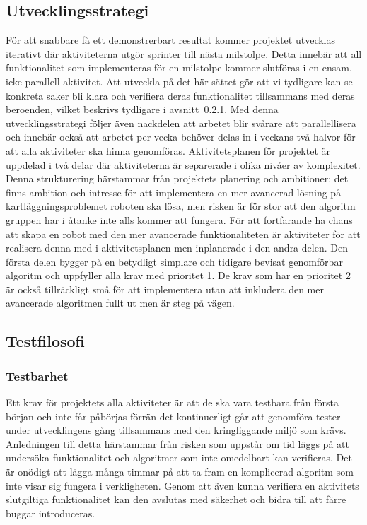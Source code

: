 \documentclass{article}
\begin{document}
\subsection{Utvecklingsstrategi}
För att snabbare få ett demonstrerbart resultat kommer projektet utvecklas iterativt där aktiviteterna utgör sprinter till nästa milstolpe. Detta innebär att all funktionalitet som implementeras för en milstolpe kommer slutföras i en ensam, icke-parallell aktivitet. Att utveckla på det här sättet gör att vi tydligare kan se konkreta saker bli klara och verifiera deras funktionalitet tillsammans med deras beroenden, vilket beskrivs tydligare i avsnitt~\ref{sec:testbarhet}. Med denna utvecklingsstrategi följer även nackdelen att arbetet blir svårare att parallellisera och innebär också att arbetet per vecka behöver delas in i veckans två halvor för att alla aktiviteter ska hinna genomföras.
\newline\newline
Aktivitetsplanen för projektet är uppdelad i två delar där aktiviteterna är separerade i olika nivåer av komplexitet. Denna strukturering härstammar från projektets planering och ambitioner: det finns ambition och intresse för att implementera en mer avancerad lösning på kartläggningsproblemet roboten ska lösa, men risken är för stor att den algoritm gruppen har i åtanke inte alls kommer att fungera. För att fortfarande ha chans att skapa en robot med den mer avancerade funktionaliteten är aktiviteter för att realisera denna med i aktivitetsplanen men inplanerade i den andra delen. Den första delen bygger på en betydligt simplare och tidigare bevisat genomförbar algoritm och uppfyller alla krav med prioritet 1. De krav som har en prioritet 2 är också tillräckligt små för att implementera utan att inkludera den mer avancerade algoritmen fullt ut men är steg på vägen.

\subsection{Testfilosofi}
\subsubsection{Testbarhet}
\label{sec:testbarhet}
Ett krav för projektets alla aktiviteter är att de ska vara testbara från första början och inte får påbörjas förrän det kontinuerligt går att genomföra tester under utvecklingens gång tillsammans med den kringliggande miljö som krävs. Anledningen till detta härstammar från risken som uppstår om tid läggs på att undersöka funktionalitet och algoritmer som inte omedelbart kan verifieras. Det är onödigt att lägga många timmar på att ta fram en komplicerad algoritm som inte visar sig fungera i verkligheten. Genom att även kunna verifiera en aktivitets slutgiltiga funktionalitet kan den avslutas med säkerhet och bidra till att färre buggar introduceras.
\end{document}
